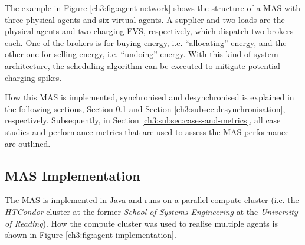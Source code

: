 

The example in Figure \ref{ch3:fig:agent-network} shows the structure of a MAS with three physical agents and six virtual agents.
A supplier and two loads are the physical agents and two charging EVS, respectively, which dispatch two brokers each.
One of the brokers is for buying energy, i.e. ``allocating'' energy, and the other one for selling energy, i.e. ``undoing'' energy.
With this kind of system architecture, the scheduling algorithm can be executed to mitigate potential charging spikes.

How this MAS is implemented, synchronised and desynchronised is explained in the following sections, Section \ref{ch3:subsec:implementation} and Section \ref{ch3:subsec:desynchronisation}, respectively.
Subsequently, in Section \ref{ch3:subsec:cases-and-metrics}, all case studies and performance metrics that are used to assess the MAS performance are outlined.

\subsection{MAS Implementation}
\label{ch3:subsec:implementation}

The MAS is implemented in Java and runs on a parallel compute cluster (i.e. the \textit{HTCondor} cluster at the former \textit{School of Systems Engineering} at the \textit{University of Reading}).
How the compute cluster was used to realise multiple agents is shown in Figure \ref{ch3:fig:agent-implementation}.



